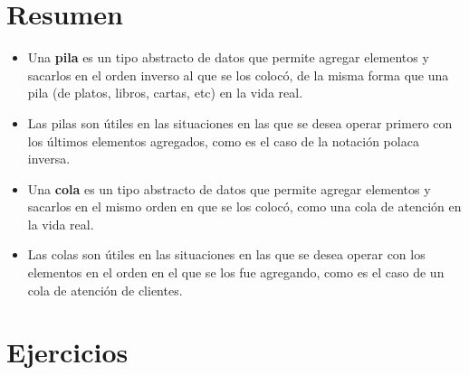 
\section{Resumen}

\begin{itemize}

\item Una {\bf pila} es un tipo abstracto de datos que permite agregar
elementos y sacarlos en el orden inverso al que se los colocó, de la misma
forma que una pila (de platos, libros, cartas, etc) en la vida real.

\item Las pilas son útiles en las situaciones en las que se desea operar
primero con los últimos elementos agregados, como es el caso de la notación
polaca inversa.

\item Una {\bf cola} es un tipo abstracto de datos que permite agregar
elementos y sacarlos en el mismo orden en que se los colocó, como una cola
de atención en la vida real.

\item Las colas son útiles en las situaciones en las que se desea operar
con los elementos en el orden en el que se los fue agregando, como es el
caso de un cola de atención de clientes.

\end{itemize}

\newpage
\section{Ejercicios}

